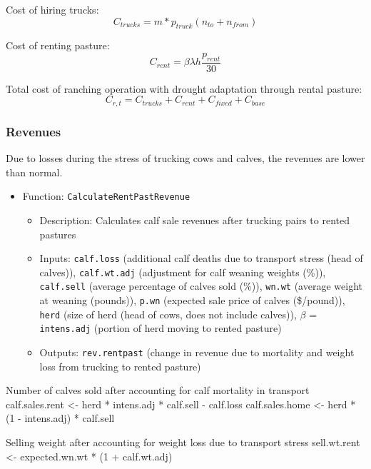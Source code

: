 \documentclass[11pt]{article}
\begin{document}
Cost of hiring trucks:
\begin{equation}
C_{trucks} =  m * p_{truck} (n_{to} + n_{from})
\end{equation}

Cost of renting pasture:
\begin{equation}
C_{rent} = \beta \lambda h  \frac{p_{rent}}{30} 
\end{equation}

Total cost of ranching operation with drought adaptation through rental pasture:
\begin{equation}
C_{r,t} = C_{trucks} + C_{rent} + C_{fixed} + C_{base}
\end{equation}


\subsubsection{Revenues}
Due to losses during the stress of trucking cows and calves, the revenues are lower than normal.

\begin{itemize}
\item Function: \verb!CalculateRentPastRevenue!
	\begin{itemize}
	\item Description: Calculates calf sale revenues after trucking pairs to rented pastures
	\item Inputs: \verb!calf.loss! (additional calf deaths due to transport stress (head of calves)), \verb!calf.wt.adj! (adjustment for calf weaning weights (\%)), \verb!calf.sell! (average percentage of calves sold (\%)), \verb!wn.wt! (average weight at weaning (pounds)), \verb!p.wn! (expected sale price of calves (\$/pound)), \verb!herd! (size of herd (head of cows, does not include calves)), $\beta$ = \verb!intens.adj! (portion of herd moving to rented pasture)
  \item Outputs: \verb!rev.rentpast! (change in revenue due to mortality and weight loss from trucking to rented pasture)
	\end{itemize}
\end{itemize}	 

  Number of calves sold after accounting for calf mortality in transport 
  calf.sales.rent <- herd * intens.adj * calf.sell - calf.loss
  calf.sales.home <- herd * (1 - intens.adj) * calf.sell
  
 Selling weight after accounting for weight loss due to transport stress
  sell.wt.rent <- expected.wn.wt * (1 + calf.wt.adj)
  
\end{document}
